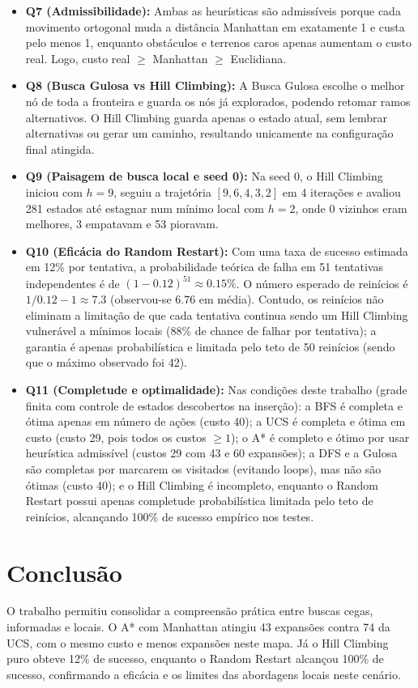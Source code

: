 \documentclass[12pt]{article}
\begin{document}
\begin{itemize}
    \item \textbf{Q7 (Admissibilidade):} Ambas as heurísticas são admissíveis porque cada movimento ortogonal muda a distância Manhattan em exatamente 1 e custa pelo menos 1, enquanto obstáculos e terrenos caros apenas aumentam o custo real. Logo, custo real $\ge$ Manhattan $\ge$ Euclidiana.
    \item \textbf{Q8 (Busca Gulosa vs Hill Climbing):} A Busca Gulosa escolhe o melhor nó de toda a fronteira e guarda os nós já explorados, podendo retomar ramos alternativos. O Hill Climbing guarda apenas o estado atual, sem lembrar alternativas ou gerar um caminho, resultando unicamente na configuração final atingida.
    \item \textbf{Q9 (Paisagem de busca local e seed 0):} Na seed 0, o Hill Climbing iniciou com $h = 9$, seguiu a trajetória $[9, 6, 4, 3, 2]$ em 4 iterações e avaliou 281 estados até estagnar num mínimo local com $h = 2$, onde 0 vizinhos eram melhores, 3 empatavam e 53 pioravam.
    \item \textbf{Q10 (Eficácia do Random Restart):} Com uma taxa de sucesso estimada em 12\% por tentativa, a probabilidade teórica de falha em 51 tentativas independentes é de $(1 - 0.12)^{51} \approx 0.15\%$. O número esperado de reinícios é $1/0.12 - 1 \approx 7.3$ (observou-se 6.76 em média). Contudo, os reinícios não eliminam a limitação de que cada tentativa continua sendo um Hill Climbing vulnerável a mínimos locais (88\% de chance de falhar por tentativa); a garantia é apenas probabilística e limitada pelo teto de 50 reinícios (sendo que o máximo observado foi 42).
    \item \textbf{Q11 (Completude e optimalidade):} Nas condições deste trabalho (grade finita com controle de estados descobertos na inserção): a BFS é completa e ótima apenas em número de ações (custo 40); a UCS é completa e ótima em custo (custo 29, pois todos os custos $\ge 1$); o A* é completo e ótimo por usar heurística admissível (custos 29 com 43 e 60 expansões); a DFS e a Gulosa são completas por marcarem os visitados (evitando loops), mas não são ótimas (custo 40); e o Hill Climbing é incompleto, enquanto o Random Restart possui apenas completude probabilística limitada pelo teto de reinícios, alcançando 100\% de sucesso empírico nos testes.
\end{itemize}

\section{Conclusão}
O trabalho permitiu consolidar a compreensão prática entre buscas cegas, informadas e locais. O A* com Manhattan atingiu 43 expansões contra 74 da UCS, com o mesmo custo e menos expansões neste mapa. Já o Hill Climbing puro obteve 12\% de sucesso, enquanto o Random Restart alcançou 100\% de sucesso, confirmando a eficácia e os limites das abordagens locais neste cenário.
\end{document}
